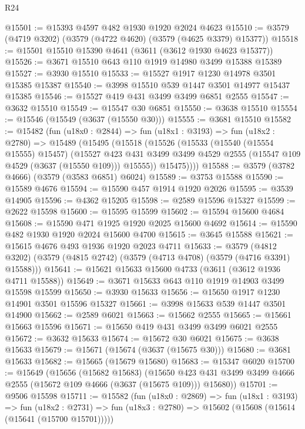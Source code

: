 \begin{lexlean}{R24}
\begin{coremodule}
@15501 := @15393 @4597 @482 @1930 @1920 @2024 @4623
@15510 := @3579 (@4719 @3202) (@3579 (@4722 @4620) (@3579 (@4625 @3379) @15377))
@15518 := @15501 @15510 @15390 @4641 (@3611 (@3612 @1930 @4623 @15377))
@15526 := @3671 @15510 @643 @110 @1919 @14980 @3499 @15388 @15389
@15527 := @3930 @15510
@15533 := @15527 @1917 @1230 @14978 @3501 @15385 @15387
@15540 := @3998 @15510 @539 @1447 @3501 @14977 @15437 @15385
@15546 := @15527 @419 @431 @3499 @3499 @6851 @2555
@15547 := @3632 @15510
@15549 := @15547 @30 @6851
@15550 := @3638 @15510
@15554 := @15546 (@15549 (@3637 (@15550 @30)))
@15555 := @3681 @15510
@15582 := @15482
    (fun (u18x0 : @2844) =>
    fun (u18x1 : @3193) =>
    fun (u18x2 : @2780) =>
    @15489
      (@15495
        (@15518
          (@15526
            (@15533
              (@15540 (@15554 @15555) @15457)
              (@15527
                @423
                @431
                @3499
                @3499
                @4529
                @2555
                (@15547 @109 @4529 (@3637 (@15550 @109)))
                @15555))
            @15475))))
@15588 := @3579 (@3782 @4666) (@3579 (@3583 @6851) @6024)
@15589 := @3753 @15588
@15590 := @15589 @4676
@15594 := @15590 @457 @1914 @1920 @2026
@15595 := @3539 @14905
@15596 := @4362 @15205
@15598 := @2589 @15596 @15327
@15599 := @2622 @15598
@15600 := @15595 @15599
@15602 := @15594 @15600 @4684
@15608 := @15590 @471 @1925 @1920 @2025 @15600 @4692
@15614 := @15590 @482 @1930 @1920 @2024 @15600 @4700
@15615 := @3645 @15588
@15621 := @15615 @4676 @493 @1936 @1920 @2023 @4711
@15633 := @3579
    (@4812 @3202)
    (@3579 (@4815 @2742) (@3579 (@4713 @4708) (@3579 (@4716 @3391) @15588)))
@15641 := @15621 @15633 @15600 @4733 (@3611 (@3612 @1936 @4711 @15588))
@15649 := @3671 @15633 @643 @110 @1919 @14903 @3499 @15598 @15599
@15650 := @3930 @15633
@15656 := @15650 @1917 @1230 @14901 @3501 @15596 @15327
@15661 := @3998 @15633 @539 @1447 @3501 @14900
@15662 := @2589 @6021
@15663 := @15662 @2555
@15665 := @15661 @15663 @15596
@15671 := @15650 @419 @431 @3499 @3499 @6021 @2555
@15672 := @3632 @15633
@15674 := @15672 @30 @6021
@15675 := @3638 @15633
@15679 := @15671 (@15674 (@3637 (@15675 @30)))
@15680 := @3681 @15633
@15682 := @15665 (@15679 @15680)
@15683 := @15347 @6020
@15700 := @15649
    (@15656
      (@15682 @15683)
      (@15650 @423 @431 @3499 @3499 @4666 @2555 (@15672 @109 @4666 (@3637 (@15675 @109))) @15680))
@15701 := @9506 @15598
@15711 := @15582
    (fun (u18x0 : @2869) =>
    fun (u18x1 : @3193) =>
    fun (u18x2 : @2731) => fun (u18x3 : @2780) => @15602 (@15608 (@15614 (@15641 (@15700 @15701)))))

\end{coremodule}
\end{lexlean}

